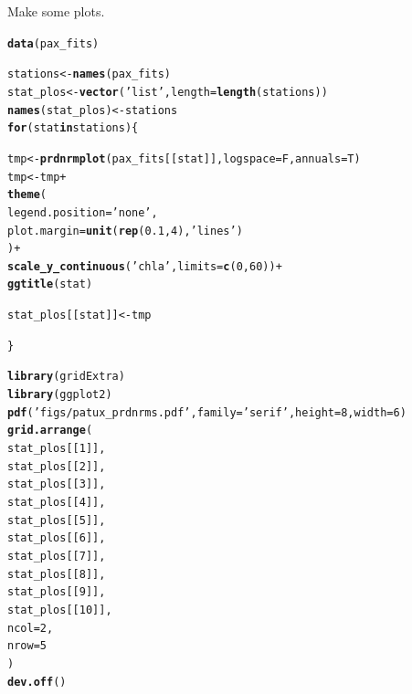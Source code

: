 \documentclass[letterpaper,12pt]{article}\usepackage[]{graphicx}\usepackage[]{color}
\makeatletter
\newcommand{\hlnum}[1]{\textcolor[rgb]{0.686,0.059,0.569}{#1}}%
\newcommand{\hlstr}[1]{\textcolor[rgb]{0.192,0.494,0.8}{#1}}%
\newcommand{\hlopt}[1]{\textcolor[rgb]{0,0,0}{#1}}%
\newcommand{\hlstd}[1]{\textcolor[rgb]{0.345,0.345,0.345}{#1}}%
\newcommand{\hlkwa}[1]{\textcolor[rgb]{0.161,0.373,0.58}{\textbf{#1}}}%
\newcommand{\hlkwb}[1]{\textcolor[rgb]{0.69,0.353,0.396}{#1}}%
\newcommand{\hlkwc}[1]{\textcolor[rgb]{0.333,0.667,0.333}{#1}}%
\newcommand{\hlkwd}[1]{\textcolor[rgb]{0.737,0.353,0.396}{\textbf{#1}}}%
\newenvironment{kframe}{%
 \def\at@end@of@kframe{}%
 \ifinner\ifhmode%
  \def\at@end@of@kframe{\end{minipage}}%
  \begin{minipage}{\columnwidth}%
 \fi\fi%
 \def\FrameCommand##1{\hskip\@totalleftmargin \hskip-\fboxsep
 \colorbox{shadecolor}{##1}\hskip-\fboxsep
     \hskip-\linewidth \hskip-\@totalleftmargin \hskip\columnwidth}%
 \MakeFramed {\advance\hsize-\width
   \@totalleftmargin\z@ \linewidth\hsize
   \@setminipage}}%
 {\par\unskip\endMakeFramed%
 \at@end@of@kframe}
\newenvironment{knitrout}{}{} %
\makeatother
\begin{document}
Make some plots.
\begin{knitrout}
\color{fgcolor}\begin{kframe}
\begin{alltt}
\hlkwd{data}\hlstd{(pax_fits)}

\hlstd{stations} \hlkwb{<-} \hlkwd{names}\hlstd{(pax_fits)}
\hlstd{stat_plos} \hlkwb{<-} \hlkwd{vector}\hlstd{(}\hlstr{'list'}\hlstd{,} \hlkwc{length} \hlstd{=} \hlkwd{length}\hlstd{(stations))}
\hlkwd{names}\hlstd{(stat_plos)} \hlkwb{<-} \hlstd{stations}
\hlkwa{for}\hlstd{(stat} \hlkwa{in} \hlstd{stations)\{}

  \hlstd{tmp} \hlkwb{<-} \hlkwd{prdnrmplot}\hlstd{(pax_fits[[stat]],} \hlkwc{logspace} \hlstd{= F,} \hlkwc{annuals} \hlstd{= T)}
  \hlstd{tmp} \hlkwb{<-} \hlstd{tmp} \hlopt{+}
    \hlkwd{theme}\hlstd{(}
      \hlkwc{legend.position} \hlstd{=} \hlstr{'none'}\hlstd{,}
      \hlkwc{plot.margin} \hlstd{=} \hlkwd{unit}\hlstd{(}\hlkwd{rep}\hlstd{(}\hlnum{0.1}\hlstd{,} \hlnum{4}\hlstd{),} \hlstr{'lines'}\hlstd{)}
      \hlstd{)} \hlopt{+}
    \hlkwd{scale_y_continuous}\hlstd{(}\hlstr{'chla'}\hlstd{,} \hlkwc{limits} \hlstd{=} \hlkwd{c}\hlstd{(}\hlnum{0}\hlstd{,} \hlnum{60}\hlstd{))} \hlopt{+}
    \hlkwd{ggtitle}\hlstd{(stat)}

  \hlstd{stat_plos[[stat]]} \hlkwb{<-} \hlstd{tmp}

  \hlstd{\}}

\hlkwd{library}\hlstd{(gridExtra)}
\hlkwd{library}\hlstd{(ggplot2)}
\hlkwd{pdf}\hlstd{(}\hlstr{'figs/patux_prdnrms.pdf'}\hlstd{,} \hlkwc{family} \hlstd{=} \hlstr{'serif'}\hlstd{,} \hlkwc{height} \hlstd{=} \hlnum{8}\hlstd{,} \hlkwc{width} \hlstd{=} \hlnum{6}\hlstd{)}
\hlkwd{grid.arrange}\hlstd{(}
  \hlstd{stat_plos[[}\hlnum{1}\hlstd{]],}
  \hlstd{stat_plos[[}\hlnum{2}\hlstd{]],}
  \hlstd{stat_plos[[}\hlnum{3}\hlstd{]],}
  \hlstd{stat_plos[[}\hlnum{4}\hlstd{]],}
  \hlstd{stat_plos[[}\hlnum{5}\hlstd{]],}
  \hlstd{stat_plos[[}\hlnum{6}\hlstd{]],}
  \hlstd{stat_plos[[}\hlnum{7}\hlstd{]],}
  \hlstd{stat_plos[[}\hlnum{8}\hlstd{]],}
  \hlstd{stat_plos[[}\hlnum{9}\hlstd{]],}
  \hlstd{stat_plos[[}\hlnum{10}\hlstd{]],}
  \hlkwc{ncol} \hlstd{=} \hlnum{2}\hlstd{,}
  \hlkwc{nrow} \hlstd{=} \hlnum{5}
  \hlstd{)}
\hlkwd{dev.off}\hlstd{()}
\end{alltt}
\end{kframe}
\end{knitrout}
\end{document}
